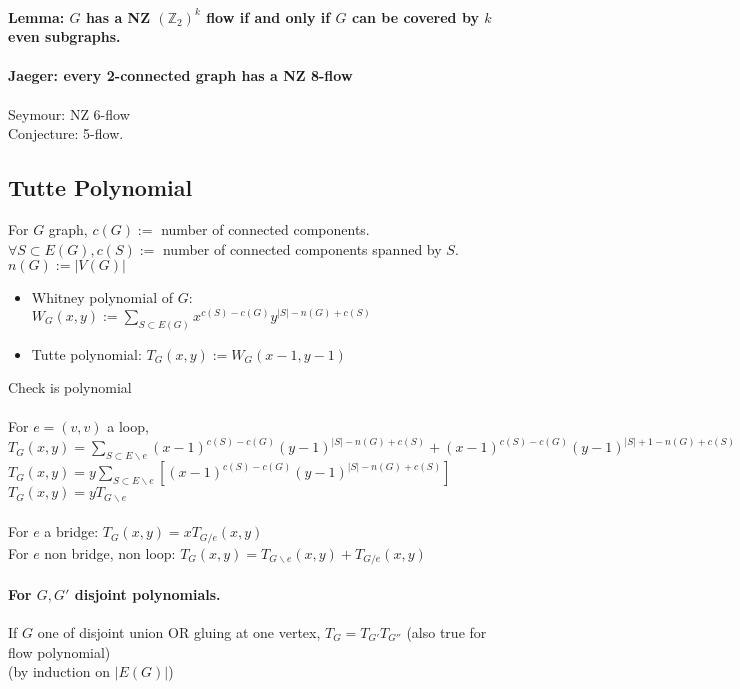 \documentclass[12pt]{article}
\begin{document}
\paragraph{Lemma: $G$ has a NZ $(\mathbb{Z}_2)^k$ flow if and only if $G$ can be covered by $k$ even subgraphs.\\}

\paragraph{Jaeger: every 2-connected graph has a NZ 8-flow\\}
Seymour: NZ 6-flow\\
Conjecture: 5-flow.\\


\subsection{Tutte Polynomial}

For $G$ graph, $c(G) :=$ number of connected components.\\
$\forall S \subset E(G), c(S) :=$ number of connected components spanned by $S$.\\
$n(G) := |V(G)|$\\

\begin{itemize}
\item Whitney polynomial of $G$: $W_G(x,y) := \sum_{S \subset E(G)} x^{c(S)-c(G)} y^{|S| - n(G) + c(S)}$
\item Tutte polynomial: $T_G(x,y) := W_G(x-1,y-1)$
\end{itemize}
Check is polynomial\\\\

For $e = (v,v)$ a loop, $T_G(x,y) = \sum_{S \subset E \backslash e} (x-1)^{c(S)-c(G)} (y-1)^{|S|-n(G)+c(S)} + (x-1)^{c(S) - c(G)} (y-1)^{|S|+1-n(G)+c(S)}$\\
$T_G(x,y) = y \sum_{S \subset E \backslash e} [(x-1)^{c(S)-c(G)} (y-1)^{|S|-n(G)+c(S)}]$\\
$T_G(x,y) = y T_{G \backslash e}$\\\\

For $e$ a bridge: $T_G(x,y) = x T_{G / e}(x,y)$\\
For $e$ non bridge, non loop: $T_G(x,y) = T_{G \backslash e}(x,y) + T_{G / e}(x,y)$\\

\paragraph{For $G, G'$ disjoint polynomials.\\}
If $G$ one of disjoint union OR gluing at one vertex, $T_G = T_{G'} T_{G''}$ (also true for flow polynomial)\\
(by induction on $|E(G)|$)\\
\end{document}
